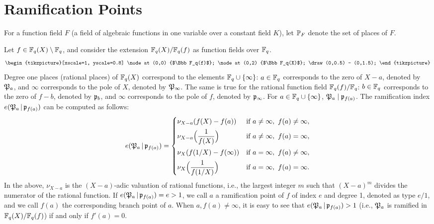 \documentclass{amsart}
\numberwithin{equation}{section}
\theoremstyle{definition}
\newcommand{\f}{\Bbb F}
\begin{document}

\section{Ramification Points}\label{sec4}

For a function field $F$ (a field of algebraic functions in one variable over a constant field $K$), let $\Bbb P_F$ denote the set of places of $F$.

Let $f\in\f_q(X)\setminus\f_q$, and consider the extension $\f_q(X)/\f_q(f)$ as function fields over $\f_q$. 
\[
\begin{tikzpicture}[xscale=1, yscale=0.8]

\node at (0,0) {$\f_q(f)$};
\node at (0,2) {$\f_q(X)$};

\draw  (0,0.5) -- (0,1.5);
\end{tikzpicture}
\]
Degree one places (rational places) of $\f_q(X)$ correspond to the elements $\f_q\cup\{\infty\}$: $a\in\f_q$ corresponds to the zero of $X-a$, denoted by $\frak P_a$, and $\infty$ corresponds to the pole of $X$, denoted by $\frak P_\infty$. The same is true for the rational function field $\f_q(f)/\f_q$: $b\in\f_q$ corresponds to the zero of $f-b$, denoted by $\frak p_b$, and $\infty$ corresponds to the pole of $f$, denoted by $\frak p_\infty$. For $a\in\f_q\cup\{\infty\}$, $\frak P_a\mid\frak p_{f(a)}$. The ramification index $e(\frak P_a\,|\,\frak p_{f(a)})$ can be computed as follows:
\[
e(\frak P_a\,|\,\frak p_{f(a)})=
\begin{cases}
\nu_{X-a}(f(X)-f(a))&\text{if}\ a\ne\infty,\ f(a)\ne\infty,\vspace{0.4em}\cr
\displaystyle\nu_{X-a}\Bigl(\frac1{f(X)}\Bigr)&\text{if}\ a\ne\infty,\ f(a)=\infty,\vspace{0.4em}\cr
\nu_X(f(1/X)-f(\infty))&\text{if}\ a=\infty,\ f(a)\ne\infty,\vspace{0.4em}\cr
\displaystyle\nu_X\Bigl(\frac1{f(1/X)}\Bigr)&\text{if}\ a=\infty,\ f(a)=\infty.
\end{cases}
\]
In the above, $\nu_{X-a}$ is the $(X-a)$-adic valuation of rational functions, i.e., the largest integer $m$ such that $(X-a)^m$ divides the numerator of the rational function. If $e(\frak P_a\,|\,\frak p_{f(a)})=e>1$, we call $a$ a ramification point of $f$ of index $e$ and degree 1, denoted as type $e/1$, and we call $f(a)$ the corresponding branch point of $a$. When $a,f(a)\ne\infty$, it is easy to see that $e(\frak P_a\,|\,\frak p_{f(a)})>1$ (i.e., $\frak P_a$ is ramified in $\f_q(X)/\f_q(f)$) if and only if $f'(a)=0$.
\end{document}

